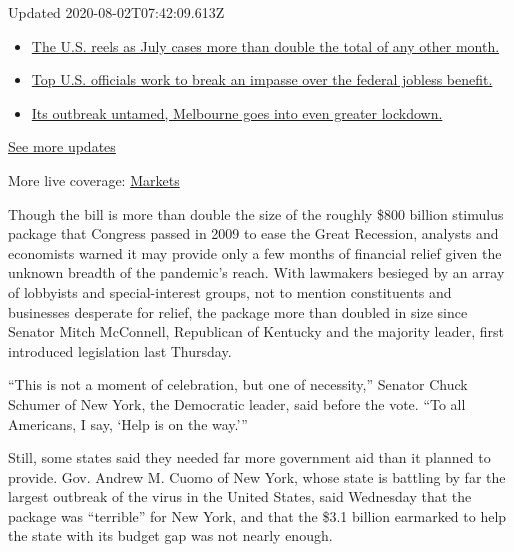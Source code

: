 Updated 2020-08-02T07:42:09.613Z

\begin{itemize}
\tightlist
\item
  \href{https://www.nytimes.com/2020/08/01/world/coronavirus-covid-19.html?action=click\&pgtype=Article\&state=default\&region=MAIN_CONTENT_1\&context=storylines_live_updates\#link-34047410}{The
  U.S. reels as July cases more than double the total of any other
  month.}
\item
  \href{https://www.nytimes.com/2020/08/01/world/coronavirus-covid-19.html?action=click\&pgtype=Article\&state=default\&region=MAIN_CONTENT_1\&context=storylines_live_updates\#link-780ec966}{Top
  U.S. officials work to break an impasse over the federal jobless
  benefit.}
\item
  \href{https://www.nytimes.com/2020/08/01/world/coronavirus-covid-19.html?action=click\&pgtype=Article\&state=default\&region=MAIN_CONTENT_1\&context=storylines_live_updates\#link-2bc8948}{Its
  outbreak untamed, Melbourne goes into even greater lockdown.}
\end{itemize}

\href{https://www.nytimes.com/2020/08/01/world/coronavirus-covid-19.html?action=click\&pgtype=Article\&state=default\&region=MAIN_CONTENT_1\&context=storylines_live_updates}{See
more updates}

More live coverage:
\href{https://www.nytimes.com/live/2020/07/31/business/stock-market-today-coronavirus?action=click\&pgtype=Article\&state=default\&region=MAIN_CONTENT_1\&context=storylines_live_updates}{Markets}

Though the bill is more than double the size of the roughly \$800
billion stimulus package that Congress passed in 2009 to ease the Great
Recession, analysts and economists warned it may provide only a few
months of financial relief given the unknown breadth of the pandemic's
reach. With lawmakers besieged by an array of lobbyists and
special-interest groups, not to mention constituents and businesses
desperate for relief, the package more than doubled in size since
Senator Mitch McConnell, Republican of Kentucky and the majority leader,
first introduced legislation last Thursday.

``This is not a moment of celebration, but one of necessity,'' Senator
Chuck Schumer of New York, the Democratic leader, said before the vote.
``To all Americans, I say, `Help is on the way.'''

Still, some states said they needed far more government aid than it
planned to provide. Gov. Andrew M. Cuomo of New York, whose state is
battling by far the largest outbreak of the virus in the United States,
said Wednesday that the package was ``terrible'' for New York, and that
the \$3.1 billion earmarked to help the state with its budget gap was
not nearly enough.

